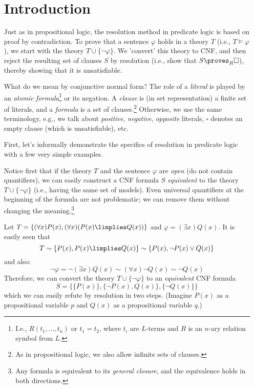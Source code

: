 \section{Introduction}\label{section:predicate-resolution-intro}

Just as in propositional logic, the resolution method in predicate logic is based on proof by contradiction. To prove that a sentence $\varphi$ holds in a theory $T$ (i.e., $T\models\varphi$), we start with the theory $T\cup\{\neg \varphi\}$. We 'convert' this theory to CNF, and then reject the resulting set of clauses $S$ by resolution (i.e., show that $S\proves_R\square$), thereby showing that it is unsatisfiable.

What do we mean by conjunctive normal form? The role of a \emph{literal} is played by an \emph{atomic formula}\footnote{I.e., $R(t_1,\dots,t_n)$ or $t_1=t_2$, where $t_i$ are $L$-terms and $R$ is an $n$-ary relation symbol from $L$.} or its negation. A \emph{clause} is (in set representation) a finite set of literals, and a \emph{formula} is a set of clauses.\footnote{As in propositional logic, we also allow infinite sets of clauses.} Otherwise, we use the same terminology, e.g., we talk about \emph{positive}, \emph{negative}, \emph{opposite} literals, $\square$ denotes an empty clause (which is unsatisfiable), etc.

First, let's informally demonstrate the specifics of resolution in predicate logic with a few very simple examples.

Notice first that if the theory $T$ and the sentence $\varphi$ are \emph{open} (do not contain quantifiers), we can easily construct a CNF formula $S$ \emph{equivalent} to the theory $T\cup\{\neg \varphi\}$ (i.e., having the same set of models). Even universal quantifiers at the beginning of the formula are not problematic; we can remove them without changing the meaning.\footnote{Any formula is equivalent to its \emph{general closure}, and the equivalence holds in both directions.}

\begin{example}
    Let $T=\{(\forall x)P(x),(\forall x)(P(x)\limplies Q(x))\}$ and $\varphi=(\exists x)Q(x)$. It is easily seen that
    $$
    T\sim \{P(x),P(x)\limplies Q(x)\}\sim\{P(x),\neg P(x)\lor Q(x)\}
    $$ 
    and also:
    $$\neg\varphi=\neg(\exists x)Q(x)\sim(\forall x)\neg Q(x)\sim\neg Q(x)$$ 
    Therefore, we can convert the theory $T\cup\{\neg \varphi\}$ to an \emph{equivalent} CNF formula
    $$
    S = \{\{P(x)\},\{\neg P(x),Q(x)\},\{\neg Q(x)\}\}
    $$
    which we can easily refute by resolution in two steps. (Imagine $P(x)$ as a propositional variable $p$ and $Q(x)$ as a propositional variable $q$.)
\end{example}

